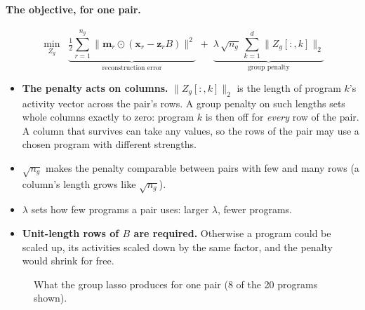 \documentclass[11pt]{article}
\newcommand{\x}{\mathbf{x}}
\newcommand{\z}{\mathbf{z}}
\newcommand{\m}{\mathbf{m}}
\begin{document}
\paragraph{The objective, for one pair.}
\begin{equation}
  \min_{Z_g}\;\;
  \underbrace{\tfrac12\sum_{r=1}^{n_g}\big\|\m_r\odot(\x_r-\z_r B)\big\|^2}_{\text{reconstruction error}}
  \;+\;
  \underbrace{\lambda\,\sqrt{n_g}\,\sum_{k=1}^{d}\big\|Z_g[:,k]\big\|_2}_{\text{group penalty}}
  \label{eq:gl}
\end{equation}

\begin{itemize}
  \item \textbf{The penalty acts on columns.} $\|Z_g[:,k]\|_2$ is the length of
  program $k$'s activity vector across the pair's rows. A group penalty on such
  lengths sets whole columns exactly to zero: program $k$ is then off for
  \emph{every} row of the pair. A column that survives can take any values, so
  the rows of the pair may use a chosen program with different strengths.
  \item \textbf{$\sqrt{n_g}$} makes the penalty comparable between pairs with
  few and many rows (a column's length grows like $\sqrt{n_g}$).
  \item \textbf{$\lambda$} sets how few programs a pair uses: larger $\lambda$,
  fewer programs.
  \item \textbf{Unit-length rows of $B$ are required.} Otherwise a program could
  be scaled up, its activities scaled down by the same factor, and the penalty
  would shrink for free.
\end{itemize}

\begin{figure}[h]
\centering
{}
\caption{What the group lasso produces for one pair (8 of the 20 programs shown).}
\end{figure}
\end{document}
